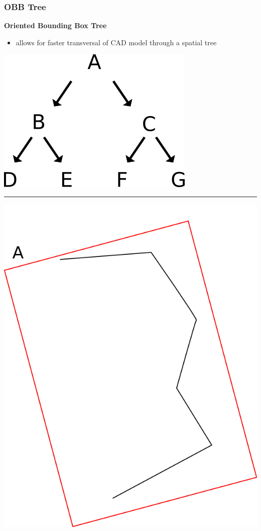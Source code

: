 \documentclass[14pt]{beamer}
\begin{document}
\begin{frame}
\frametitle{OBB Tree}
\textbf{Oriented Bounding Box Tree}
\begin{itemize}
\item allows for faster transversal of CAD model through a spatial tree
\end{itemize}


\begin{center}
\includegraphics[scale=0.2]{OBB_Tree.png} 
\end{center}
\hrule
\begin{center}
\includegraphics[scale=0.18]{OBB_A.png}

\end{center}
\end{frame}
\end{document}
